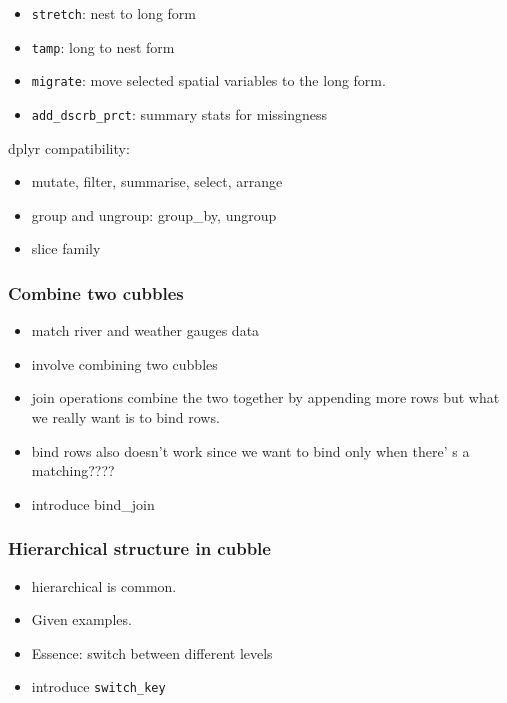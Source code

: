 \documentclass{article}
\begin{document}
\begin{itemize}
\tightlist
\item
  \texttt{stretch}: nest to long form
\item
  \texttt{tamp}: long to nest form
\item
  \texttt{migrate}: move selected spatial variables to the long form.
\item
  \texttt{add\_dscrb\_prct}: summary stats for missingness
\end{itemize}

dplyr compatibility:

\begin{itemize}
\tightlist
\item
  mutate, filter, summarise, select, arrange
\item
  group and ungroup: group\_by, ungroup
\item
  slice family
\end{itemize}

\hypertarget{combine-two-cubbles}{%
\subsubsection{Combine two cubbles}\label{combine-two-cubbles}}

\begin{itemize}
\tightlist
\item
  match river and weather gauges data
\item
  involve combining two cubbles
\item
  join operations combine the two together by appending more rows but
  what we really want is to bind rows.
\item
  bind rows also doesn't work since we want to bind only when there' s a
  matching????
\item
  introduce bind\_join
\end{itemize}

\hypertarget{hierarchical-structure-in-cubble}{%
\subsubsection{Hierarchical structure in
cubble}\label{hierarchical-structure-in-cubble}}

\begin{itemize}
\tightlist
\item
  hierarchical is common.
\item
  Given examples.
\item
  Essence: switch between different levels
\item
  introduce \texttt{switch\_key}
\end{itemize}
\end{document}
